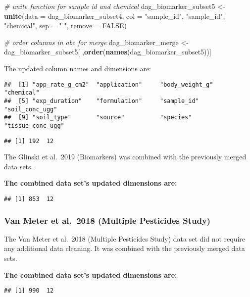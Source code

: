 \documentclass[
]{article}
\newenvironment{Shaded}{\begin{snugshade}}{\end{snugshade}}
\newcommand{\CommentTok}[1]{\textcolor[rgb]{0.56,0.35,0.01}{\textit{#1}}}
\newcommand{\DataTypeTok}[1]{\textcolor[rgb]{0.13,0.29,0.53}{#1}}
\newcommand{\KeywordTok}[1]{\textcolor[rgb]{0.13,0.29,0.53}{\textbf{#1}}}
\newcommand{\NormalTok}[1]{#1}
\newcommand{\OtherTok}[1]{\textcolor[rgb]{0.56,0.35,0.01}{#1}}
\newcommand{\StringTok}[1]{\textcolor[rgb]{0.31,0.60,0.02}{#1}}
\begin{document}
\begin{Shaded}
\begin{Highlighting}[]
\CommentTok{# unite function for sample id and chemical}
\NormalTok{dag_biomarker_subset5 <-}\StringTok{ }\KeywordTok{unite}\NormalTok{(}\DataTypeTok{data =}\NormalTok{ dag_biomarker_subset4, }\DataTypeTok{col =} \StringTok{"sample_id"}\NormalTok{, }\StringTok{"sample_id"}\NormalTok{, }\StringTok{"chemical"}\NormalTok{, }\DataTypeTok{sep =} \StringTok{" "}\NormalTok{, }\DataTypeTok{remove =} \OtherTok{FALSE}\NormalTok{)}

\CommentTok{# order columns in abc for merge}
\NormalTok{dag_biomarker_merge <-}\StringTok{ }\NormalTok{dag_biomarker_subset5[ ,}\KeywordTok{order}\NormalTok{(}\KeywordTok{names}\NormalTok{(dag_biomarker_subset5))]}
\end{Highlighting}
\end{Shaded}

The updated column names and dimensions are:

\begin{verbatim}
##  [1] "app_rate_g_cm2"  "application"     "body_weight_g"   "chemical"       
##  [5] "exp_duration"    "formulation"     "sample_id"       "soil_conc_ugg"  
##  [9] "soil_type"       "source"          "species"         "tissue_conc_ugg"
\end{verbatim}

\begin{verbatim}
## [1] 192  12
\end{verbatim}

The Glinski et al.~2019 (Biomarkers) was combined with the previously
merged data sets.

\textbf{The combined data set's updated dimensions are:}

\begin{verbatim}
## [1] 853  12
\end{verbatim}

\hypertarget{van-meter-et-al.-2018-multiple-pesticides-study-1}{%
\subsubsection{Van Meter et al.~2018 (Multiple Pesticides
Study)}\label{van-meter-et-al.-2018-multiple-pesticides-study-1}}

The Van Meter et al.~2018 (Multiple Pesticides Study) data set did not
require any additional data cleaning. It was combined with the
previously merged data sets.

\textbf{The combined data set's updated dimensions are:}

\begin{verbatim}
## [1] 990  12
\end{verbatim}
\end{document}
